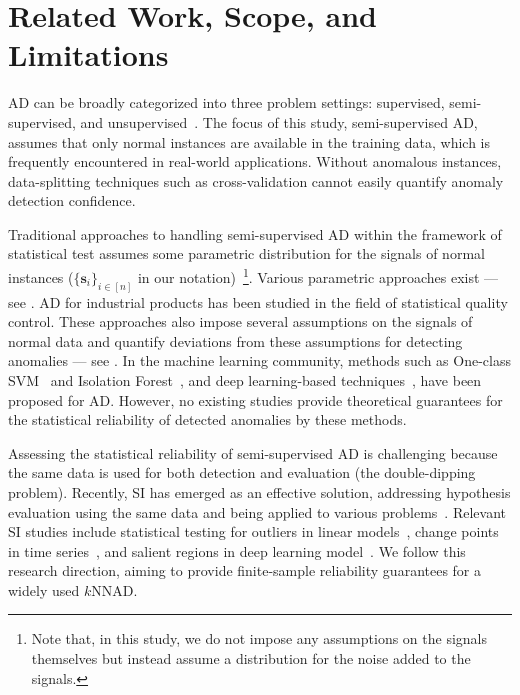 \section{Related Work, Scope, and Limitations}
\label{sec:relatedWorks}
%
AD can be broadly categorized into three problem settings: supervised, semi-supervised, and unsupervised~\cite{mehrotra2017anomaly,ramaswamy2000efficient,breunig2000lof}.
%
The focus of this study, semi-supervised AD, assumes that only normal instances are available in the training data, which is frequently encountered in real-world applications.
%
Without anomalous instances, data-splitting techniques such as cross-validation cannot easily quantify anomaly detection confidence.

Traditional approaches to handling semi-supervised AD within the framework of statistical test assumes some parametric distribution for the signals of normal instances ($\{\bm{s}_i\}_{i \in [n]}$ in our notation)~\footnote{Note that, in this study, we do not impose any assumptions on the signals themselves but instead assume a distribution for the noise added to the signals.}.
%
Various parametric approaches exist --- see \citet{barnett1994outliers}.
%
AD for industrial products has been studied in the field of statistical quality control.
%
These approaches also impose several assumptions on the signals of normal data and quantify deviations from these assumptions for detecting anomalies --- see \citet{montgomery2020introduction}.
%
In the machine learning community, methods such as One-class SVM~\citep{scholkopf2001estimating} and Isolation Forest~\citep{liu2008isolation}, and deep learning-based techniques~\citep{chalapathy2019deep,bergman2020deep,li2021cutpaste}, have been proposed for AD. 
%
However, no existing studies provide theoretical guarantees for the statistical reliability of detected anomalies by these methods. 

Assessing the statistical reliability of semi-supervised AD is challenging because the same data is used for both detection and evaluation (the double-dipping problem).
%
Recently, SI has emerged as an effective solution, addressing hypothesis evaluation using the same data and being applied to various problems~\citep{lee2015evaluating,yang2016selective,suzumura2017selective,hyun2018exact,rugamer2020inference,tanizaki2020computing,das2021fast,rugamer2022selective,gao2022selective,le2024cad}.
%
Relevant SI studies include statistical testing for outliers in linear models~\cite{chen2019valid,tsukurimichi2022conditional}, change points in time series~\cite{duy2020computing,hyun2021post,jewell2022testing,shiraishi2024selective}, and salient regions in deep learning model~\cite{duy2020quantifying,daikivalid,shiraishi2024statistical,miwa2024statistical,katsuoka2024statistical}.
%
We follow this research direction, aiming to provide finite-sample reliability guarantees for a widely used $k$NNAD.

